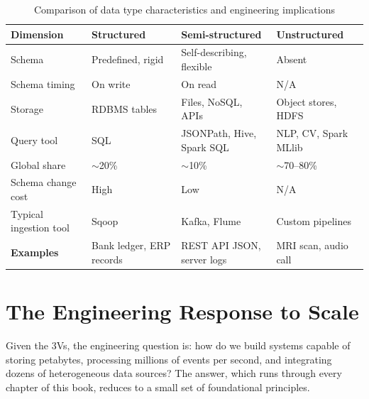 \begin{table}[h!t]
\centering
\caption{Comparison of data type characteristics and engineering implications}
\label{tab:data-type-comparison}
\renewcommand{\arraystretch}{1.45}
\begin{tabular}{L{2.8cm} L{2.6cm} L{3.2cm} L{2.8cm}}
\toprule
\textbf{Dimension}       & \textbf{Structured}     & \textbf{Semi-structured}  & \textbf{Unstructured} \\
\midrule
Schema                   & Predefined, rigid        & Self-describing, flexible & Absent \\
Schema timing            & On write                 & On read                   & N/A \\
Storage                  & RDBMS tables             & Files, NoSQL, APIs        & Object stores, HDFS \\
Query tool               & SQL                      & JSONPath, Hive, Spark SQL & NLP, CV, Spark MLlib \\
Global share             & $\sim$20\%               & $\sim$10\%                & $\sim$70--80\% \\
Schema change cost       & High                     & Low                       & N/A \\
Typical ingestion tool   & Sqoop                    & Kafka, Flume              & Custom pipelines \\
\textbf{Examples}        & Bank ledger, ERP records & REST API JSON, server logs & MRI scan, audio call \\
\bottomrule
\end{tabular}
\end{table}


\section{The Engineering Response to Scale}
\label{sec:engineering-response}

Given the 3Vs, the engineering question is: how do we build systems
capable of storing petabytes, processing millions of events per second,
and integrating dozens of heterogeneous data sources? The answer, which
runs through every chapter of this book, reduces to a small set of
foundational principles.

